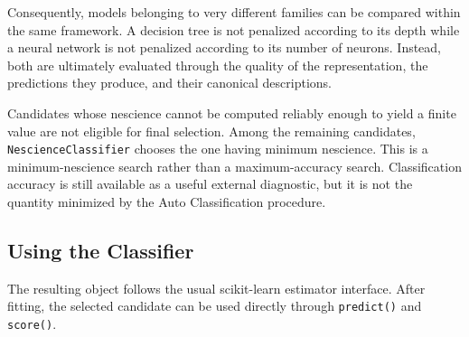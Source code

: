 Consequently, models belonging to very different families can be compared within the same framework. A decision tree is not penalized according to its depth while a neural network is not penalized according to its number of neurons. Instead, both are ultimately evaluated through the quality of the representation, the predictions they produce, and their canonical descriptions.

Candidates whose nescience cannot be computed reliably enough to yield a finite value are not eligible for final selection. Among the remaining candidates, \texttt{NescienceClassifier} chooses the one having minimum nescience. This is a minimum-nescience search rather than a maximum-accuracy search. Classification accuracy is still available as a useful external diagnostic, but it is not the quantity minimized by the Auto Classification procedure.


\subsection*{Using the Classifier}

The resulting object follows the usual scikit-learn estimator interface. After fitting, the selected candidate can be used directly through \texttt{predict()} and \texttt{score()}.


